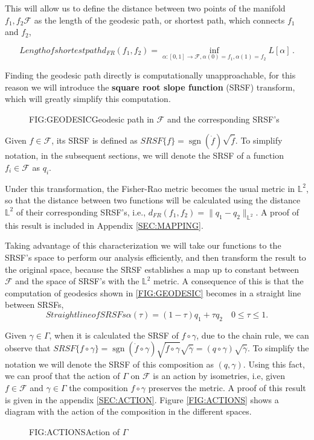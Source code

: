 This will allow us to define the distance between two points of the
manifold $f_1, f_2 \mathcal{F}$ as the length of the geodesic path, or shortest
path, which connects $f_1$ and $f_2$,

\begin{equation}[]{Length of shortest path}
d_{F R}\left(f_{1}, f_{2}\right)=\inf _{\alpha :[0,1]
\rightarrow \mathcal{F}, \alpha(0)=f_{1}, \alpha(1)=f_{2}} L[\alpha] \, .
\end{equation}

Finding the geodesic path directly is computationally unapproachable,
for this reason we will introduce the \textbf{square root slope function} (SRSF)
transform, which will greatly simplify this computation.

\begin{figure}[Geodesic path in $\mathcal{F}$]{FIG:GEODESIC}{Geodesic path in $\mathcal{F}$ and the corresponding SRSF's}
   \quad
\end{figure}

Given $f \in \mathcal{F}$, its SRSF is defined as
$SRSF\{f\} = \operatorname{sgn}{(\dot f)} \sqrt{\dot f}$. To simplify notation, in the
subsequent sections, we will denote the SRSF of a function
$f_i \in \mathcal{F}$ as $q_i$.

Under this transformation, the Fisher-Rao metric becomes the usual metric
in $\mathbb{L}^2$, so that the distance between two functions will be
calculated using the distance $\mathbb{L}^2$ of their corresponding
SRSF's, i.e.,  $d_{FR}(f_1, f_2) = \| q_1 - q_2 \|_{\mathbb{L}^2}$. A proof of
this result is included in Appendix \ref{SEC:MAPPING}.

Taking advantage of this characterization we will take our functions to the
SRSF's space to perform our analysis efficiently, and then transform the result
to the original space, because the SRSF establishes a map up to constant between
$\mathcal{F}$ and the space of SRSF's with the $\mathbb{L}^2$ metric.
A consequence of this is that the computation of geodesics shown in
\ref{FIG:GEODESIC} becomes in a straight line
between SRSFs, 
\begin{equation}[]{Straight line of SRSFs}
\alpha(\tau) = (1 - \tau)q_1 + \tau q_2 \quad 0 \le \tau \le 1.
\end{equation}

Given $\gamma \in \Gamma$, when it is calculated the SRSF of $f \circ \gamma$,
due to the chain rule, we can observe that
$SRSF\{f \circ \gamma\} = \operatorname{sgn}(\dot{f} \circ \gamma) \sqrt{\dot f \circ \gamma}
\sqrt{\dot \gamma} = (q \circ \gamma) \sqrt{\dot \gamma}$. To simplify the
notation we  will denote the SRSF of this composition as $(q, \gamma)$.
Using this fact, we can proof that the action of $\Gamma$ on $\mathscr{F}$ is an
action by isometries, i.e, given $f  \in \mathscr{F}$ and $\gamma \in \Gamma$
the composition $f \circ \gamma$ preserves the metric.
A proof of this result is given in the appendix \ref{SEC:ACTION}.
Figure \ref{FIG:ACTIONS} shows a diagram with the action of the composition
in the different spaces.

\begin{figure}[Action of $\Gamma$]{FIG:ACTIONS}{Action of $\Gamma$}


\end{figure}
